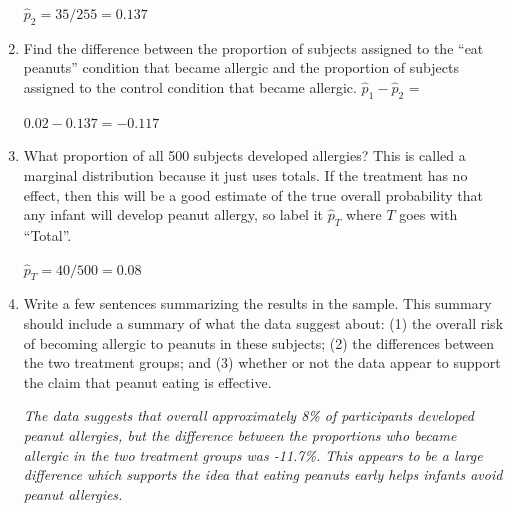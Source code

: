 \begin{enumerate}
\begin{key}
  {\it  $\widehat{p}_2 = 35/255 = 0.137$}
\end{key}



   \item Find the difference between the proportion of subjects
     assigned to the ``eat peanuts'' condition that became allergic and the
     proportion of subjects assigned to the control condition that
     became allergic.  $\widehat{p}_1 - \widehat{p}_2$ = 
\begin{students}
\vspace{2cm}
\end{students}

\begin{key}
  {\it  $0.02 - 0.137 = -0.117$}
\end{key}

   \item What proportion of all 500 subjects developed allergies?  This is called
     a marginal distribution because it just uses totals.  If the
     treatment has no effect, then this will be a good estimate of the
     true overall probability that any infant will develop peanut
     allergy, so label it $\widehat{p}_T$ where $T$ goes with ``Total''.
\begin{students}
\vspace{2cm}
\end{students}

\begin{key}
  {\it $\widehat{p}_T = 40/500 = 0.08$ }
\end{key}


   \item  Write a few sentences summarizing the results in the
     sample. This summary should include a summary of what the data
     suggest about: (1) the overall risk of becoming allergic to
     peanuts in these  subjects; (2) the differences between the two
     treatment groups; 
     and (3) whether or not the data appear to support the claim that
     peanut eating is effective. 
\begin{students}
\vspace{4cm}
\end{students}

\begin{key}
  {\it       The data suggests that overall approximately 8\% of
     participants developed peanut allergies, but the difference
     between the proportions who became allergic in the two treatment
     groups  was -11.7\%.  This appears to be a large difference which
     supports the idea that eating peanuts early helps infants avoid
     peanut allergies.}
\end{key}

   \end{enumerate}
   
